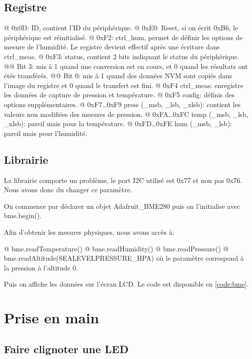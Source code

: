 \documentclass{report}
\begin{document}
  		\section{Registre}
  			\begin{easylist}[itemize]
  				@ 0x0D: ID, contient l'ID du périphérique.
  				@ 0xE0: Reset, si on écrit 0xB6, le périphérique est réinitialisé.
  				@ 0xF2: ctrl\_hum, permet de définir les options de mesure de l'humidité. Le registre devient effectif après une écriture dans ctrl\_meas.
  				@ 0xF3: status, contient 2 bits indiquant le status du périphérique.
  				@@ Bit 3: mis à 1 quand une conversion est en cours, et 0 quand les résultats ont étés transférés.
  				@@ Bit 0: mis à 1 quand des données NVM sont copiés dans l'image du registre et 0 quand le transfert est fini.
  				@ 0xF4 ctrl\_meas: enregistre les données de capture de pression et température.
  				@ 0xF5 config: définis des options supplémentaires.
  				@ 0xF7…0xF9 press (\_msb, \_lsb, \_xlsb): contient les valeurs non modifiées des mesures de pression.
  				@ 0xFA…0xFC temp (\_msb, \_lsb, \_xlsb): pareil mais pour la température.
  				@ 0xFD…0xFE hum (\_msb, \_lsb): pareil mais pour l'humidité.
  				\end{easylist}
  			
  		\section{Librairie}
  			La librairie comporte un problème, le port I2C utilisé est 0x77 et non pas 0x76.
  			Nous avons donc du changer ce paramètre.
  			
  			On commence par déclarer un objet Adafruit\_BME280 puis on l'initialise avec bme.begin().
  			
  			Afin d'obtenir les mesures physiques, nous avons accès à:
  			\begin{easylist}[itemize]
  				@ bme.readTemperature()
  				@ bme.readHumidity()
  				@ bme.readPressure()
  				@ bme.readAltitude(SEALEVELPRESSURE\_HPA) où le paramètre correspond à la pression à l'altitude 0.
  			\end{easylist}
  			
  			Puis on affiche les données sur l'écran LCD.
  			Le code est disponible en \autoref{code:bme}.

			
\appendix
	\chapter{Prise en main}
		\section{Faire clignoter une LED\label{code:led}}
			
			
\end{document}
